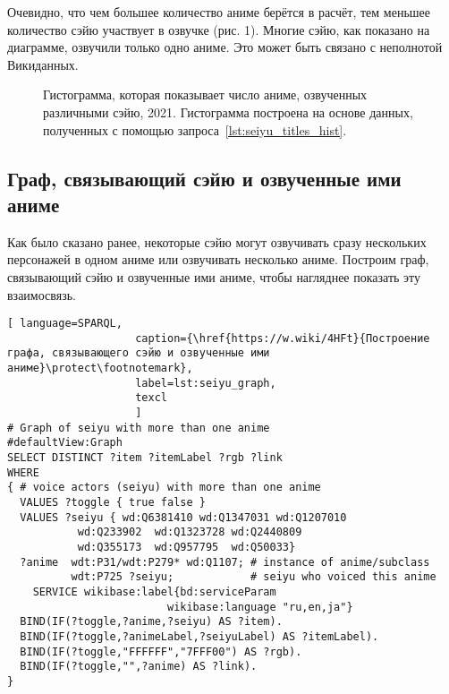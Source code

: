 Очевидно, что чем большее количество аниме берётся в расчёт, тем меньшее количество сэйю участвует в озвучке (рис. 1). Многие сэйю, как показано на диаграмме, озвучили только одно аниме. Это может быть связано с неполнотой Викиданных.

\begin{figure*}[h]

    \setlength{\fboxsep}{0pt}%
    \setlength{\fboxrule}{1pt}%
	\caption[Гистограмма, которая показывает число аниме, озвученных различными сэйю, 2021.]{Гистограмма, которая показывает число аниме, озвученных различными сэйю, 2021. Гистограмма построена на основе данных, полученных с помощью запроса~\protect\ref{lst:seiyu_titles_hist}.}%
    \label{fig:Seiyu_histogram_2021_ru}%
\end{figure*} 

\subsection{Граф, связывающий сэйю и озвученные ими аниме}

Как было сказано ранее, некоторые сэйю могут озвучивать сразу нескольких персонажей в одном аниме или озвучивать несколько аниме. Построим граф, связывающий сэйю и озвученные ими аниме, чтобы нагляднее показать эту взаимосвязь. 

\begin{lstlisting}[ language=SPARQL, 
                    caption={\href{https://w.wiki/4HFt}{Построение графа, связывающего сэйю и озвученные ими аниме}\protect\footnotemark},
                    label=lst:seiyu_graph,
                    texcl 
                    ]
# Graph of seiyu with more than one anime
#defaultView:Graph
SELECT DISTINCT ?item ?itemLabel ?rgb ?link
WHERE
{ # voice actors (seiyu) with more than one anime
  VALUES ?toggle { true false }
  VALUES ?seiyu { wd:Q6381410 wd:Q1347031 wd:Q1207010 
           wd:Q233902  wd:Q1323728 wd:Q2440809 
           wd:Q355173  wd:Q957795  wd:Q50033}
  ?anime  wdt:P31/wdt:P279* wd:Q1107; # instance of anime/subclass
          wdt:P725 ?seiyu;            # seiyu who voiced this anime 
    SERVICE wikibase:label{bd:serviceParam
					     wikibase:language "ru,en,ja"}
  BIND(IF(?toggle,?anime,?seiyu) AS ?item).
  BIND(IF(?toggle,?animeLabel,?seiyuLabel) AS ?itemLabel).
  BIND(IF(?toggle,"FFFFFF","7FFF00") AS ?rgb).
  BIND(IF(?toggle,"",?anime) AS ?link).
}
\end{lstlisting}%

